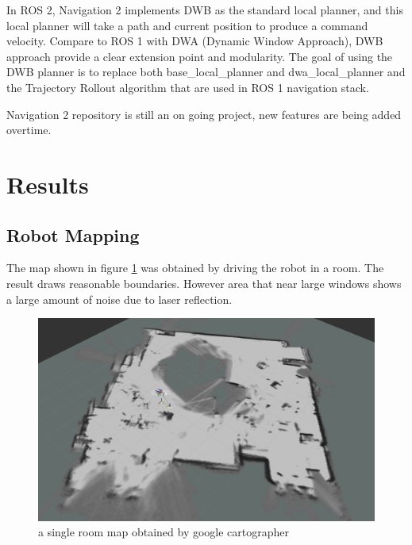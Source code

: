 \documentclass[letterpaper, 10 pt, conference]{ieeeconf}  %
\begin{document}
In ROS 2, Navigation 2 implements DWB as the standard local planner, and this local planner will take a path and current position to produce a command velocity\cite{c9}. Compare to ROS 1 with DWA (Dynamic Window Approach), DWB approach provide a clear extension point and modularity. The goal of using the DWB planner is to replace both base\_local\_planner and dwa\_local\_planner and the Trajectory Rollout algorithm that are used in ROS 1 navigation stack. 

Navigation 2 repository is still an on going project, new features are being added overtime. \par\vspace{8pt} 
\section{Results}\label{results}
\subsection{Robot Mapping}
The map shown in figure \ref{fig:map} was obtained by driving the robot in a room. The result draws reasonable boundaries. However area that near large windows shows a large amount of noise due to laser reflection. 
\begin{figure}[!pht]
  \includegraphics[width=\linewidth]{map.png}
  \caption{a single room map obtained by google cartographer} 
  \label{fig:map}
\end{figure}
\end{document}
